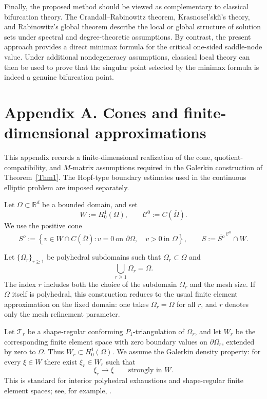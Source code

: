 \documentclass[preprint,10pt]{elsarticle}
\numberwithin{equation}{section}
\begin{document}
Finally, the proposed method should be viewed as complementary to classical
bifurcation theory. The Crandall--Rabinowitz theorem, Krasnosel'ski\u{\i}'s
theory, and Rabinowitz's global theorem describe the local or global structure
of solution sets under spectral and degree-theoretic assumptions. By contrast,
the present approach provides a direct minimax formula for the critical
one-sided saddle-node value. Under additional nondegeneracy assumptions,
classical local theory can then be used to prove that the singular point
selected by the minimax formula is indeed a genuine bifurcation point.




\section{Appendix A. Cones and finite-dimensional approximations}
\label{sec:appendix-FE}

This appendix records a finite-dimensional realization of the cone,
quotient-compatibility, and \(M\)-matrix assumptions required in the Galerkin
construction of Theorem~\ref{Thm1}. The Hopf-type boundary estimates used in
the continuous elliptic problem are imposed separately.

Let \(\Omega\subset\mathbb R^d\) be a bounded domain, and set
\[
W:=H_0^1(\Omega),
\qquad
\mathcal C^0:=C(\overline\Omega).
\]
We use the positive cone
\[
S^o
:=
\left\{
v\in W\cap C(\overline\Omega):
v=0 \ \text{on }\partial\Omega,\quad v>0 \ \text{in }\Omega
\right\},
\qquad
S:=\overline{S^o}^{\,\mathcal C^0}\cap W .
\]

Let \(\{\Omega_r\}_{r\ge1}\) be polyhedral subdomains such that
\(\Omega_r\subset\Omega\) and
\[
\bigcup_{r\ge1}\Omega_r=\Omega .
\]
The index \(r\) includes both the choice of the subdomain \(\Omega_r\) and
the mesh size. If \(\Omega\) itself is polyhedral, this construction reduces
to the usual finite element approximation on the fixed domain: one takes
\(\Omega_r=\Omega\) for all \(r\), and \(r\) denotes only the mesh refinement
parameter.

Let \(\mathcal T_r\) be a shape-regular conforming \(P_1\)-triangulation of
\(\Omega_r\), and let \(W_r\) be the corresponding finite element space with
zero boundary values on \(\partial\Omega_r\), extended by zero to \(\Omega\).
Thus \(W_r\subset H_0^1(\Omega)\). We assume the Galerkin density property:
for every \(\xi\in W\) there exist \(\xi_r\in W_r\) such that
\[
\xi_r\to\xi
\qquad\text{strongly in }W .
\]
This is standard for interior polyhedral exhaustions and shape-regular finite
element spaces; see, for example, \cite{ciaretRav,ciaret,Ern}.
\end{document}
